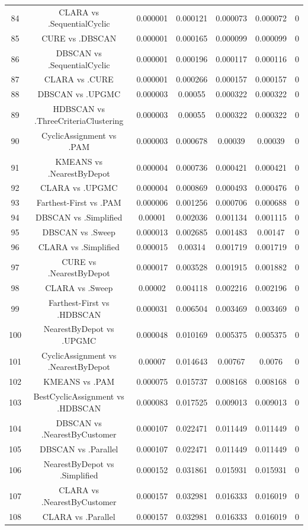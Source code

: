 \documentclass[a4paper,10pt]{article}
\begin{document}
\begin{landscape}
\begin{table}[!htp]
\begin{tabular}{ccccccc}
84&CLARA vs .SequentialCyclic&0.000001&0.000121&0.000073&0.000072&0\\
85&CURE vs .DBSCAN&0.000001&0.000165&0.000099&0.000099&0\\
86&DBSCAN vs .SequentialCyclic&0.000001&0.000196&0.000117&0.000116&0\\
87&CLARA vs .CURE&0.000001&0.000266&0.000157&0.000157&0\\
88&DBSCAN vs .UPGMC&0.000003&0.00055&0.000322&0.000322&0\\
89&HDBSCAN vs .ThreeCriteriaClustering&0.000003&0.00055&0.000322&0.000322&0\\
90&CyclicAssignment vs .PAM&0.000003&0.000678&0.00039&0.00039&0\\
91&KMEANS vs .NearestByDepot&0.000004&0.000736&0.000421&0.000421&0\\
92&CLARA vs .UPGMC&0.000004&0.000869&0.000493&0.000476&0\\
93&Farthest-First vs .PAM&0.000006&0.001256&0.000706&0.000688&0\\
94&DBSCAN vs .Simplified&0.00001&0.002036&0.001134&0.001115&0\\
95&DBSCAN vs .Sweep&0.000013&0.002685&0.001483&0.00147&0\\
96&CLARA vs .Simplified&0.000015&0.00314&0.001719&0.001719&0\\
97&CURE vs .NearestByDepot&0.000017&0.003528&0.001915&0.001882&0\\
98&CLARA vs .Sweep&0.00002&0.004118&0.002216&0.002196&0\\
99&Farthest-First vs .HDBSCAN&0.000031&0.006504&0.003469&0.003469&0\\
100&NearestByDepot vs .UPGMC&0.000048&0.010169&0.005375&0.005375&0\\
101&CyclicAssignment vs .NearestByDepot&0.00007&0.014643&0.00767&0.0076&0\\
102&KMEANS vs .PAM&0.000075&0.015737&0.008168&0.008168&0\\
103&BestCyclicAssignment vs .HDBSCAN&0.000083&0.017525&0.009013&0.009013&0\\
104&DBSCAN vs .NearestByCustomer&0.000107&0.022471&0.011449&0.011449&0\\
105&DBSCAN vs .Parallel&0.000107&0.022471&0.011449&0.011449&0\\
106&NearestByDepot vs .Simplified&0.000152&0.031861&0.015931&0.015931&0\\
107&CLARA vs .NearestByCustomer&0.000157&0.032981&0.016333&0.016019&0\\
108&CLARA vs .Parallel&0.000157&0.032981&0.016333&0.016019&0\\

\end{tabular}
\end{table}
\end{landscape}
\end{document}
